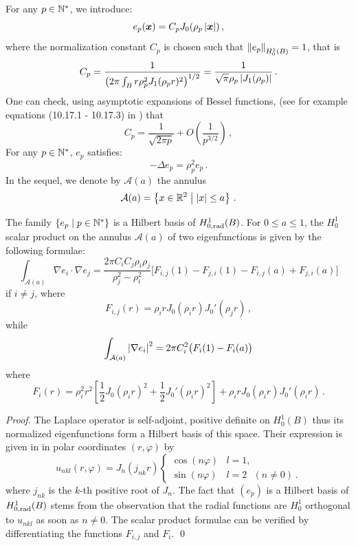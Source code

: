 \documentclass[smallextended]{svjour3}
\begin{document}
\noindent For any $p\in \mathbb{N}^*$, we introduce:
\[e_p(\boldsymbol{x}) = C_p J_0(\rho_p \left\lvert \boldsymbol{x} \right\rvert)\,,\]
where the normalization constant $C_p$ is chosen such that $\left\|e_p\right\|_{H^1_0(B)} = 1$, that is  
\[C_p = \dfrac{1}{\left(2\pi \int_B  r \rho_p^2 J_1 (\rho_p r)^2\right)^{1/2}} = \dfrac{1}{\sqrt{\pi}\rho_p\left\lvert J_1(\rho_p) \right\rvert}\,.\]
One can check, using asymptotic expansions of Bessel functions, (see for example equations  (10.17.1 - 10.17.3) in \cite{NIST:DLMF}) that
\begin{equation}
\label{estimCp}
C_p = \dfrac{1}{\sqrt{2 \pi p}} + O\left(\frac{1}{p^{3/2}}\right)\,, 
\end{equation}
\noindent For any $p \in \mathbb{N}^*$, $e_p$ satisfies:
\begin{equation}
	\label{epEstUnVP}
	-\Delta e_p = \rho_p^2 e_p\,.
\end{equation}
In the sequel, we denote by $\mathcal{A}(a)$ the annulus 
\[\mathcal{A}(a) = \left\{x\in \mathbb{R}^2\mathrel{}\middle|\mathrel{}\left\lvert x \right\rvert \leq a\right\}\,.\]
\begin{theorem} 
	\label{epEstUneBaseDeHilbert}
	The family $\left\{e_p \mid p\in \mathbb{N}^*\right\}$ is a Hilbert basis of $H^1_{0,\textup{rad}}(B)$. For $0 \leq a \leq 1$, the $H^1_0$ scalar product on the annulus $\mathcal{A}(a)$ of two eigenfunctions is given by the following formulae:
	\[ \int_{\mathcal{A}(a) } \nabla e_i \cdot \nabla e_j = \frac{2\pi C_i C_j \rho_i \rho_j}{\rho_j^2 - \rho_i^2}\bigg[F_{i,j}(1) - F_{j,i}(1) - F_{i,j}(a) + F_{j,i}(a)\bigg]\]
	if $i \neq j$, 
	where 
	\[	 F_{i,j}(r) =  \rho_i r J_0(\rho_i r)J_0'(\rho_j r)\,,\]
	while
	\begin{equation*}
		\int_{\mathcal{A}(a) } \left\lvert  \nabla e_i \right\rvert^2 = 2\pi C_i^2 \big(F_i(1) - F_i(a)\big)
	\end{equation*}
	where 
	\[F_i(r) = \rho_i^2r^2\left[\dfrac{1}{2}J_0(\rho_ir)^2 + \frac{1}{2}J_0'(\rho_ir)^2\right] + \rho_irJ_0(\rho_i r)J_0'(\rho_ir)\,.\]
\end{theorem}
\begin{proof}
	The Laplace operator is self-adjoint, positive definite on $H_0^1(B)$ thus its normalized eigenfunctions form a Hilbert basis of this space. Their expression is given in \cite[Eq. (3.9)]{grebenkov2013geometrical} in polar coordinates $(r,\varphi)$ by
	\[u_{nkl}(r,\varphi) = J_n(j_{nk}r ) \begin{cases}
	\cos(n\varphi) & l = 1,\\
	\sin(n\varphi) & l = 2 \text{ } (n \neq 0)\,.
	\end{cases}\]
	where $j_{nk}$ is the $k$-th positive root of $J_n$. The fact that $(e_p)$ is a Hilbert basis of $H^1_{0,\textup{rad}}(B)$ stems from the observation that the radial functions are $H^1_0$ orthogonal to $u_{nkl}$ as soon as $n \neq 0$. The scalar product formulae can be verified by differentiating the functions $F_{i,j}$ and $F_i$. 
	\qed
\end{proof}
\end{document}
